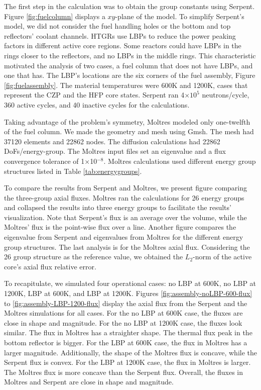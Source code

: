The first step in the calculation was to obtain the group constants using Serpent.
Figure \ref{fig:fuelcolumn} displays a $xy$-plane of the model.
To simplify Serpent's model, we did not consider the fuel handling holes or the bottom and top reflectors' coolant channels.
\glspl{HTGR} use \glspl{LBP} to reduce the power peaking factors in different active core regions.
Some reactors could have \glspl{LBP} in the rings closer to the reflectors, and no \glspl{LBP} in the middle rings.
This characteristic motivated the analysis of two cases, a fuel column that does not have \glspl{LBP}, and one that has.
The LBP's locations are the six corners of the fuel assembly, Figure \ref{fig:fuelassembly}.
The material temperatures were 600K and 1200K, cases that represent the \gls{CZP} and the \gls{HFP} core states.
Serpent ran 4$\times 10^5$ neutrons/cycle, 360 active cycles, and 40 inactive cycles for the calculations.

Taking advantage of the problem's symmetry, Moltres modeled only one-twelfth of the fuel column.
We made the geometry and mesh using Gmsh.
The mesh had 37120 elements and 22862 nodes.
The diffusion calculations had 22862 \glspl{DoF}/energy-group.
The Moltres input files set an eigenvalue and a flux convergence tolerance of 1$\times$10$^{-8}$.
Moltres calculations used different energy group structures listed in Table \ref{tab:energygroups}.

To compare the results from Serpent and Moltres, we present figure comparing the three-group axial fluxes.
Moltres ran the calculations for 26 energy groups and collapsed the results into three energy groups to facilitate the results' visualization.
Note that Serpent's flux is an average over the volume, while the Moltres' flux is the point-wise flux over a line.
Another figure compares the eigenvalue from Serpent and eigenvalues from Moltres for the different energy group structures.
The last analysis is for the Moltres axial flux.
Considering the 26 group structure as the reference value, we obtained the $L_2$-norm of the active core's axial flux relative error.

To recapitulate, we simulated four operational cases: no \gls{LBP} at 600K, no \gls{LBP} at 1200K, \gls{LBP} at 600K, and \gls{LBP} at 1200K.
Figures \ref{fig:assembly-noLBP-600-flux} to \ref{fig:assembly-LBP-1200-flux} display the axial flux from the Serpent and the Moltres simulations for all cases.
For the no LBP at 600K case, the fluxes are close in shape and magnitude.
For the no LBP at 1200K case, the fluxes look similar.
The flux in Moltres has a straighter shape.
The thermal flux peak in the bottom reflector is bigger.
For the LBP at 600K case, the flux in Moltres has a larger magnitude.
Additionally, the shape of the Moltres flux is concave, while the Serpent flux is convex.
For the LBP at 1200K case, the flux in Moltres is larger.
The Moltres flux is more concave than the Serpent flux.
Overall, the fluxes in Moltres and Serpent are close in shape and magnitude.

